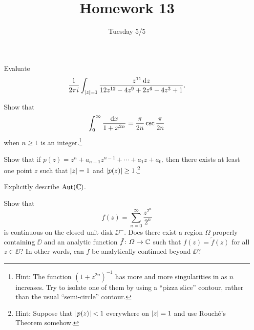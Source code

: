 \documentclass {../math135}
\title {Homework 13}
\author {}
\date {Tuesday 5/5}
\begin{document}
\begin {exercise}
	Evaluate
	\[
		\frac 1 {2 \pi i} \int_{\lvert z\rvert=1}
    \frac {z^{11} \mathop{}\!\mathrm d z} {12 z^{12} - 4z^9 + 2z^6 - 4z^3 + 1}.
	\]

  \begin {solution}

  \end {solution}

\end {exercise}

\begin {exercise}
	Show that
	\[
		\int_0^\infty \frac {\mathop{}\!\mathrm d x} {1+x^{2n}}
    = \frac \pi {2n} \csc \frac \pi {2n}
	\]
	when \(n\geq 1\) is an integer.\footnote{Hint: The function
    \((1+z^{2n})^{-1}\) has more and more singularities in as \(n\)
    increases.  Try to isolate one of them by using a ``pizza slice''
    contour, rather than the usual ``semi-circle'' contour.}

  \begin {solution}

  \end {solution}

\end {exercise}

\begin {exercise}
	Show that if \(p(z) = z^n + a_{n-1}z^{n-1} + \cdots + a_1 z + a_0\),
  then there exists at least one point \(z\) such that \(\lvert z\rvert=1\)
  and \(\lvert p(z)\rvert \ge 1\).\footnote{Hint: Suppose that
    \(\lvert p(z)\rvert < 1\) everywhere on \(\lvert z\rvert = 1\) and use
    Rouch\'e's Theorem somehow.}

  \begin {solution}

  \end {solution}

\end {exercise}

\begin {exercise}
	Explicitly describe \(\operatorname{Aut} (\mathbb C)\).

  \begin {solution}

  \end {solution}

\end {exercise}

\begin {exercise}
	Show that
	\[
		f(z) = \sum_{n=0}^\infty \frac {z^{2^n}} {2^n}
	\]
	is continuous on the closed unit disk \(\DD^-\).  Does there exist a
  region \(\Omega\) properly containing \(\DD\) and an analytic
  function \(\tilde f \colon \Omega \to \mathbb C\) such that
  \(f(z) = \tilde f (z)\) for all \(z \in \DD\)?  In other words, can
  \(f\) be analytically continued beyond \(\DD\)?

  \begin {solution}

  \end {solution}

\end {exercise}
\end{document}
